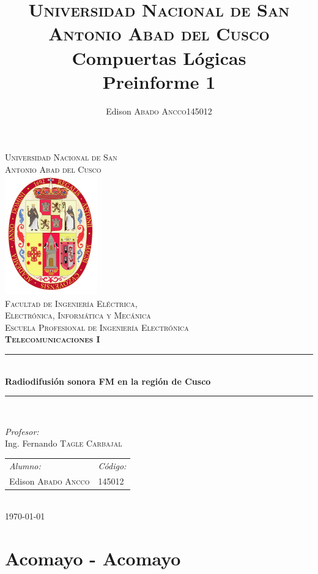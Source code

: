 \documentclass[11pt]{article}
\title{
	\textsc{Universidad Nacional de San Antonio Abad del Cusco}\\
	\textbf{Compuertas Lógicas}\\
	Preinforme 1}
\author{
	\begin{tabular}{lr}
		Edison \textsc{Abado Ancco} & 145012 \\
	\end{tabular}
}
\begin{document}
	
	\begin{titlepage}
		\newcommand{\HRule}{\rule{\linewidth}{0.5mm}} 
		\center
		\textsc{\LARGE  Universidad Nacional de San \\[0.2cm] Antonio Abad del Cusco}\\[1.5cm] 
		\includegraphics[width=4cm]{IMAGENES/escudo}\\[1cm]
		\textsc{\Large Facultad de Ingeniería Eléctrica, \\ Electrónica, Informática y Mecánica}\\[0.5cm] 
		\textsc{\large Escuela Profesional de Ingeniería Electrónica}\\[0.5cm]
		\textsc{\Large \textbf{Telecomunicaciones I}}\\[0.5cm] 
		\HRule \\[0.4cm]
		{ \huge \bfseries Radiodifusión sonora FM en la región de Cusco}\\[0.4cm] 
		\HRule \\[1.5cm]
		\begin{minipage}{\textwidth}
			\center 
			
			\emph{Profesor:} \\
			Ing. Fernando \textsc{Tagle Carbajal } \\[1cm]
			
			\begin{tabular}{ll}
				\emph{Alumno:} & \emph{Código:}\\
				Edison \textsc{Abado Ancco} & 145012 \\
			\end{tabular}
		\end{minipage}\\[2cm]
		\today
	\end{titlepage}
	
	
	\newpage
	
	
\section{Acomayo - Acomayo}
\end{document}
